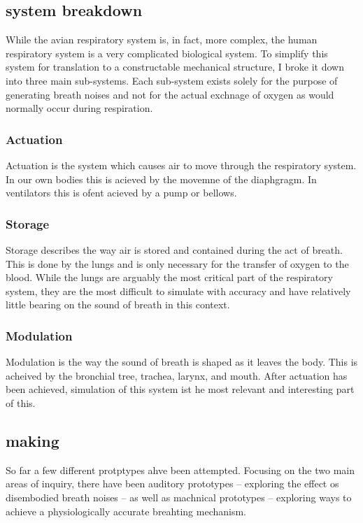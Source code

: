 \documentclass[letterpaper]{article}
\begin{document}
\subsection{system breakdown}

While the avian respiratory system is, in fact, more complex, the human respiratory system is a very complicated biological system. \cite{breathcomplexity} To simplify this system for translation to a constructable mechanical structure, I broke it down into three main sub-systems. Each sub-system exists solely for the purpose of generating breath noises and not for the actual exchnage of oxygen as would normally occur during respiration.  

\subsubsection{Actuation}

Actuation is the system which causes air to move through the respiratory system. In our own bodies this is acieved by the movemne of the diaphgragm. In ventilators this is ofent acieved by a pump or bellows.

\subsubsection{Storage}

Storage describes the way air is stored and contained during the act of breath. This is done by the lungs and is only necessary for the transfer of oxygen to the blood. While the lungs are arguably the most critical part of the respiratory system, they are the most difficult to simulate with accuracy and have relatively little bearing on the sound of breath in this context. 

\subsubsection{Modulation}

Modulation is the way the sound of breath is shaped as it leaves the body. This is acheived by the bronchial tree, trachea, larynx, and mouth. After actuation has been achieved, simulation of this system ist he most relevant and interesting part of this.   

\subsection{making}

So far a few different protptypes ahve been attempted. Focusing on the two main areas of inquiry, there have been auditory prototypes -- exploring the effect os disembodied breath noises -- as well as machnical prototypes -- exploring ways to achieve a physiologically accurate breahting mechanism. 
\end{document}
